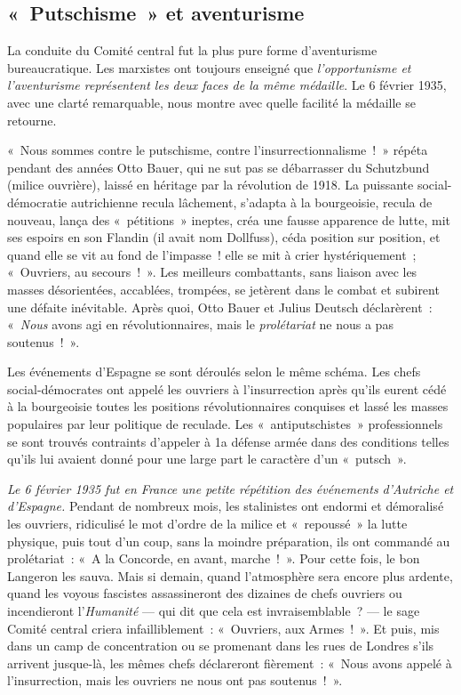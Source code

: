 \documentclass[french,twoside]{book} %
\begin{document}
\subsection[{« Putschisme » et aventurisme}]{« Putschisme » et aventurisme}
\noindent La conduite du Comité central fut la plus pure forme d’aventurisme bureaucratique. Les marxistes ont toujours enseigné que \emph{l’opportunisme et l’aventurisme représentent les deux faces de la même médaille}. Le 6 février 1935, avec une clarté remarquable, nous montre avec quelle facilité la médaille se retourne.\par
« Nous sommes contre le putschisme, contre l’insurrectionnalisme ! » répéta pendant des années Otto Bauer, qui ne sut pas se débarrasser du Schutzbund (milice ouvrière), laissé en héritage par la révolution de 1918. La puissante social-démocratie autrichienne recula lâchement, s’adapta à la bourgeoisie, recula de nouveau, lança des « pétitions » ineptes, créa une fausse apparence de lutte, mit ses espoirs en son Flandin (il avait nom Dollfuss),  céda position sur position, et quand elle se vit au fond de l’impasse ! elle se mit à crier hystériquement ; « Ouvriers, au secours ! ». Les meilleurs combattants, sans liaison avec les masses désorientées, accablées, trompées, se jetèrent dans le combat et subirent une défaite inévitable. Après quoi, Otto Bauer et Julius Deutsch déclarèrent : « \emph{Nous} avons agi en révolutionnaires, mais le \emph{prolétariat} ne nous a pas soutenus ! ».\par
Les événements d’Espagne se sont déroulés selon le même schéma. Les chefs social-démocrates ont appelé les ouvriers à l’insurrection après qu’ils eurent cédé à la bourgeoisie toutes les positions révolutionnaires conquises et lassé les masses populaires par leur politique de reculade. Les « antiputschistes » professionnels se sont trouvés contraints d’appeler à 1a défense armée dans des conditions telles qu’ils lui avaient donné pour une large part le caractère d’un « putsch ».\par
\emph{Le 6 février 1935 fut en France une petite répétition des événements d’Autriche et d’Espagne.} Pendant de nombreux mois, les stalinistes ont endormi et démoralisé les ouvriers, ridiculisé le mot d’ordre de la milice et « repoussé » la lutte physique, puis tout d’un coup, sans la moindre préparation, ils ont commandé au prolétariat : « A la Concorde, en avant, marche ! ». Pour cette fois, le bon Langeron les sauva. Mais si demain, quand l’atmosphère sera encore plus ardente, quand les voyous fascistes assassineront des dizaines de chefs ouvriers ou incendieront l’\emph{Humanité} — qui dit que cela est invraisemblable ? — le sage Comité central criera infailliblement : « Ouvriers, aux Armes ! ». Et puis, mis dans un camp de concentration ou se promenant dans les rues de Londres s’ils arrivent jusque-là, les mêmes chefs déclareront fièrement : « Nous avons appelé à l’insurrection, mais les ouvriers ne nous ont pas soutenus ! ».
\end{document}
